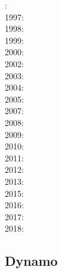 {\scriptsize
{}: \cite{rehi73}\\
1997: \cite{bare97}\\
1998: \cite{cosh98}\\
1999: \cite{riwg99}\\
2000: \cite{coks00}\cite{brmm00}\cite{cacp00}\\
2002: \cite{cacp02}\cite{coks02}\cite{arbc02}\cite{gurw02}\\
2003: \cite{cock03}\\
2004: \cite{coks04}\\
2005: \cite{cacs05}\cite{coks05}\cite{cogo05a}\cite{cogo05b}\cite{cogo05c}\\
2007: \cite{coks07}\cite{feku07}\\
2008: \cite{kans08}\cite{mofh08}\cite{dole08}\cite{pepe08}\\
2009: \cite{coks09}\cite{cogo09}\cite{cogl09}\cite{ngpc09}\cite{shu09}\cite{codg08}\cite{cogw09}\\
2010: \cite{ngpc10}\cite{conp10}\cite{mofp10}\cite{kari10}\cite{cogs10}\\
2011: \cite{geor11}\cite{ngpc11}\\
2012: \cite{kauf12}\cite{ngpe12}\cite[chapt. 31]{lomw12}\\
2013: \cite{vyrc13}\cite{rhcv13}\\
2015: \cite{lelk15}\cite{kalc15}\\
2016: \cite{cock16}\cite{makc16}\\
2017: \cite{fewk17}\cite{iglo17}\cite{hepb17}\cite{chll17}\cite{sclu17a}\cite{sclu17b}
      \cite{sclu17c}\cite{zhan17}\\
2018: \cite{puth18}\cite{wogu18}\cite{fakr18}\cite{muwy18}
}

\subsection{Dynamo}

\cite{haha05}
\cite{erhh13}




